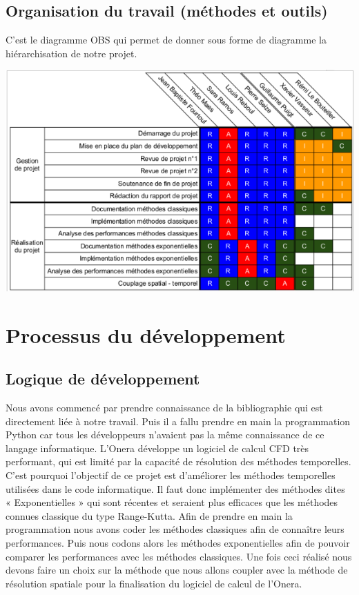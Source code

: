 \documentclass[a4paper,12pt]{report}
\theoremstyle{break}
\begin{document}
\section{Organisation du travail (méthodes et outils)}
    C’est le diagramme OBS qui permet de donner sous forme de diagramme la hiérarchisation de notre projet.
    
    \begin{center}
    
    \includegraphics[width=1\textwidth]{images/OB2.png}\\[1cm]

    \end{center} 
    
\chapter{Processus du développement}
\section{Logique de développement}

    Nous avons commencé par prendre connaissance de la bibliographie qui est directement liée à notre travail. Puis il a fallu prendre en main la programmation Python car tous les développeurs n’avaient pas la même connaissance de ce langage informatique. L’Onera développe un logiciel de calcul CFD très performant, qui est limité par la capacité de résolution des méthodes temporelles. C’est pourquoi l’objectif de ce projet est d’améliorer les méthodes temporelles utilisées dans le code informatique. Il faut donc implémenter des méthodes dites « Exponentielles » qui sont récentes et seraient plus efficaces que les méthodes connues classique du type Range-Kutta. Afin de prendre en main la programmation nous avons coder les méthodes classiques afin de connaître leurs performances. Puis nous codons alors les méthodes exponentielles afin de pouvoir comparer les performances avec les méthodes classiques. Une fois ceci réalisé nous devons faire un choix sur la méthode que nous allons coupler avec la méthode de résolution spatiale pour la finalisation du logiciel de calcul de l’Onera. 
\end{document}

